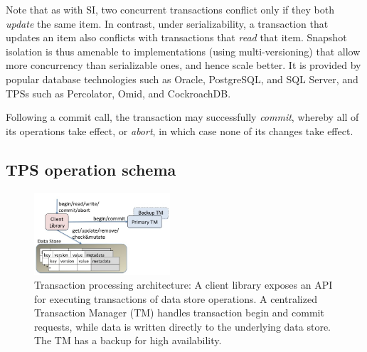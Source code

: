 {Note that as with SI, two concurrent transactions conflict only if they both \emph{update} the same item.  
In contrast, under serializability, a transaction that updates an item also conflicts with transactions that \emph{read} that item. 
Snapshot isolation is thus amenable to implementations (using multi-versioning) that 
allow more concurrency than serializable ones, and hence scale better.
It is provided by popular database technologies such as Oracle, PostgreSQL, and SQL Server,
and TPSs such as Percolator, Omid, and  CockroachDB.

Following a commit call, the transaction may successfully \emph{commit}, whereby all of its operations take effect, 
or 
\emph{abort}, in which case none of its changes take effect. 








\subsection{TPS operation schema}
\label{ssec:schema}

\begin{figure}
\centerline{
\includegraphics[width=0.45\textwidth]{FragolaComponents.jpg}
}
\caption{Transaction processing architecture: A client library exposes an  API for  executing transactions of data store operations. 
A centralized Transaction Manager (TM) handles transaction begin and commit requests, while data is written directly to the 
underlying data store. The TM has a backup for high availability.}
\label{fig:components}
\end{figure}

}
